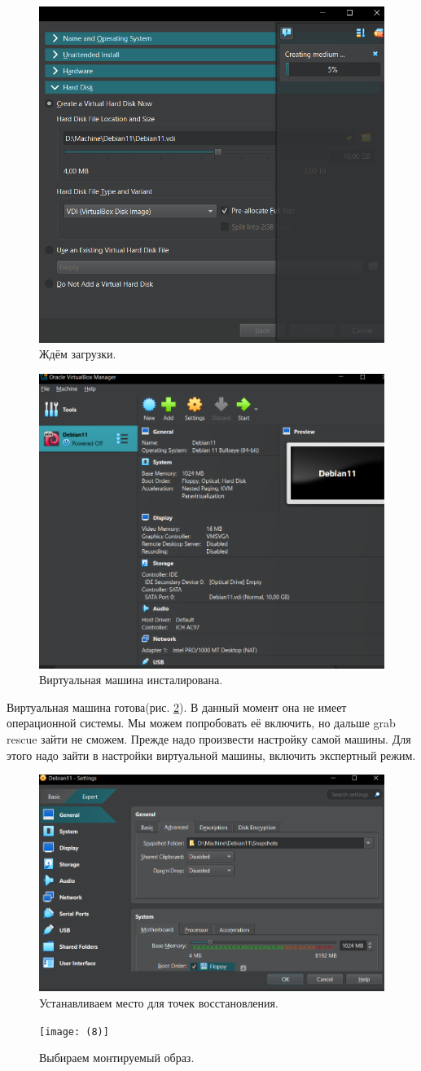 \begin{figure}[h!]
    \centering
    \includegraphics[width=0.3\linewidth]{Pic/lab4/Вставленное изображение (5).png}
    \caption{Ждём загрузки.}
    \label{fig:enter-label}
\end{figure}

\begin{figure}[h!]
    \centering
    \includegraphics[width=0.3\linewidth]{Pic/lab4/Вставленное изображение (6).png}
    \caption{Виртуальная машина инсталирована.}
    \label{fig:installedVB}
\end{figure}
\newpage
Виртуальная машина готова(рис. \ref{fig:installedVB}). В данный момент она не имеет операционной системы. Мы можем попробовать её включить, но дальше grab rescue зайти не сможем. Прежде надо произвести настройку самой машины. Для этого надо зайти в настройки виртуальной машины, включить экспертный режим.

\begin{figure}[h!]
    \centering
    \includegraphics[width=0.3\linewidth]{Pic/lab4/Вставленное изображение (7).png}
    \caption{Устанавливаем место для точек восстановления.}
    \label{fig:enter-label}
\end{figure}

\begin{figure}[h!]
    \centering
    \texttt{[image: (8)]}
    \caption{Выбираем монтируемый образ.}
    \label{fig:enter-label}
\end{figure}

